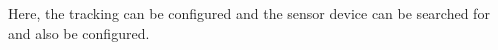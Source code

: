 \begin{minipage}{0.45\textwidth}
Here, the tracking can be configured and the sensor device can be searched for and also be configured.
\end{minipage} \hfill
\begin{minipage}{0.5\textwidth}
\end{minipage}
